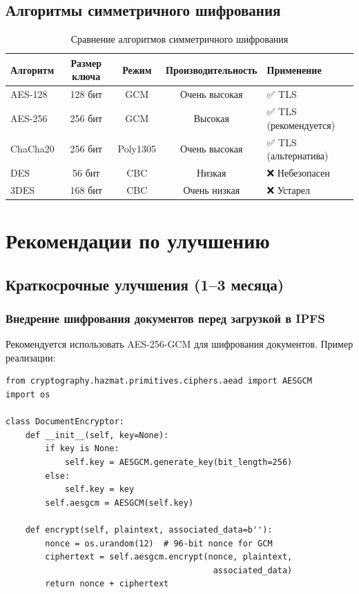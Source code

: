 \documentclass[a4paper,14pt]{extreport}
\begin{document}
\section{Алгоритмы симметричного шифрования}

\begin{table}[H]
\centering
\caption{Сравнение алгоритмов симметричного шифрования}
\label{tab:symmetric_algorithms}
\begin{tabular}{|l|c|c|c|l|}
\hline
\textbf{Алгоритм} & \textbf{Размер ключа} & \textbf{Режим} & \textbf{Производительность} & \textbf{Применение} \\
\hline
AES-128 & 128 бит & GCM & Очень высокая & ✅ TLS \\
AES-256 & 256 бит & GCM & Высокая & ✅ TLS (рекомендуется) \\
ChaCha20 & 256 бит & Poly1305 & Очень высокая & ✅ TLS (альтернатива) \\
DES & 56 бит & CBC & Низкая & ❌ Небезопасен \\
3DES & 168 бит & CBC & Очень низкая & ❌ Устарел \\
\hline
\end{tabular}
\end{table}

\newpage

\chapter{Рекомендации по улучшению}

\section{Краткосрочные улучшения (1--3 месяца)}

\subsection{Внедрение шифрования документов перед загрузкой в IPFS}

Рекомендуется использовать AES-256-GCM для шифрования документов. Пример реализации:

\begin{lstlisting}[caption=Пример шифрования документов,captionpos=b]
from cryptography.hazmat.primitives.ciphers.aead import AESGCM
import os

class DocumentEncryptor:
    def __init__(self, key=None):
        if key is None:
            self.key = AESGCM.generate_key(bit_length=256)
        else:
            self.key = key
        self.aesgcm = AESGCM(self.key)
    
    def encrypt(self, plaintext, associated_data=b''):
        nonce = os.urandom(12)  # 96-bit nonce for GCM
        ciphertext = self.aesgcm.encrypt(nonce, plaintext, 
                                          associated_data)
        return nonce + ciphertext
\end{lstlisting}
\end{document}
